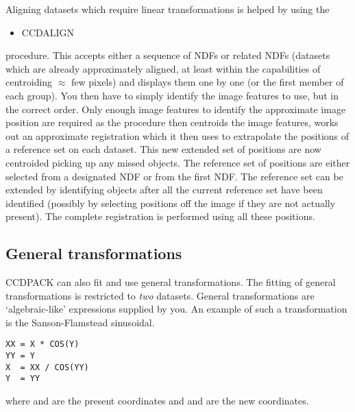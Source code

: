 Aligning datasets which require linear transformations is helped by
using the
\begin{itemize}
\item CCDALIGN
\end{itemize}
procedure. This accepts either a sequence of NDFs or related NDFs
(datasets which are already approximately aligned, at least within the
capabilities of centroiding $\approx$ few pixels) and displays them one
by one (or the first member of each group). You then have to simply
identify the image features to use, but in the correct order. Only
enough image features to identify the approximate image position are
required as the  procedure then centroids the image features, works out
an approximate registration which it then uses to extrapolate the
positions of a reference set on each dataset. This new extended set of
positions are now centroided picking up any missed objects. The
reference set of positions are either selected from a designated NDF or
from the first NDF. The reference set can be extended by identifying
objects after all the current reference set have been identified
(possibly by selecting positions off the image if they are not actually
present). The complete registration is performed using all these
positions.

\subsection{General transformations}
\label{general_transforms}
CCDPACK can also fit and use general transformations. The fitting of
general transformations is restricted to {\em two} datasets. General
transformations are `algebraic-like' expressions supplied by you. An
example of such a transformation is the Sanson-Flamstead sinusoidal.
\begin{myquote}
\begin{verbatim}
XX = X * COS(Y)
YY = Y
X  = XX / COS(YY)
Y  = YY
\end{verbatim}
\end{myquote}
where  and  are the present coordinates and
 and  are the new coordinates.

